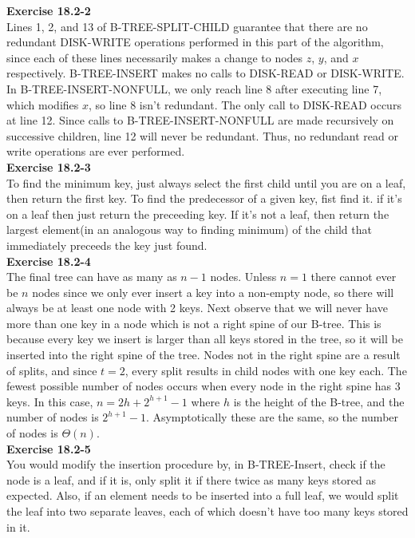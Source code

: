 \documentclass{article}
\begin{document}
\noindent\textbf{Exercise 18.2-2}\\

Lines 1, 2, and 13 of B-TREE-SPLIT-CHILD guarantee that there are no redundant DISK-WRITE operations performed in this part of the algorithm, since each of these lines necessarily makes a change to nodes $z$, $y$, and $x$ respectively.  B-TREE-INSERT makes no calls to DISK-READ or DISK-WRITE.  In B-TREE-INSERT-NONFULL, we only reach line 8 after executing line 7, which modifies $x$, so line 8 isn't redundant.  The only call to DISK-READ occurs at line 12.  Since calls to B-TREE-INSERT-NONFULL are made recursively on successive children, line 12 will never be redundant.  Thus, no redundant read or write operations are ever performed.\\

\noindent\textbf{Exercise 18.2-3}\\

To find the minimum key, just always select the first child until you are on a leaf, then return the first key. To find the predecessor of a given key, fist find it. if it's on a leaf then just return the preceeding key. If it's not a leaf, then return the largest element(in an analogous way to finding minimum) of the child that immediately preceeds the key just found.\\ 

\noindent\textbf{Exercise 18.2-4}\\

The final tree can have as many as $n-1$ nodes. Unless $n=1$ there cannot ever be $n$ nodes since we only ever insert a key into a non-empty node, so there will always be at least one node with 2 keys.  Next observe that we will never have more than one key in a node which is not a right spine of our B-tree.  This is because every key we insert is larger than all keys stored in the tree, so it will be inserted into the right spine of the tree.  Nodes not in the right spine are a result of splits, and since $t=2$, every split results in child nodes with one key each. The fewest possible number of nodes occurs when every node in the right spine has 3 keys.  In this case, $n=2h + 2^{h+1}-1$ where $h$ is the height of the B-tree, and the number of nodes is $2^{h+1}-1$.  Asymptotically these are the same, so the number of nodes is $\Theta(n)$.\\

\noindent\textbf{Exercise 18.2-5}\\

You would modify the insertion procedure by, in B-TREE-Insert, check if the node is a leaf, and if it is, only split it if there twice as many keys stored as expected. Also, if an element needs to be inserted into a full leaf, we would split the leaf into two separate leaves, each of which doesn't have too many keys stored in it.\\
\end{document}
